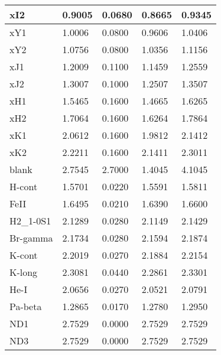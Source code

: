 \begin{longtable*}[c]{|p{0.110\DUtablewidth}|p{0.086\DUtablewidth}|p{0.086\DUtablewidth}|p{0.145\DUtablewidth}|p{0.133\DUtablewidth}|}
xI2
 & 
0.9005
 & 
0.0680
 & 
0.8665
 & 
0.9345
 \\
\hline

xY1
 & 
1.0006
 & 
0.0800
 & 
0.9606
 & 
1.0406
 \\
\hline

xY2
 & 
1.0756
 & 
0.0800
 & 
1.0356
 & 
1.1156
 \\
\hline

xJ1
 & 
1.2009
 & 
0.1100
 & 
1.1459
 & 
1.2559
 \\
\hline

xJ2
 & 
1.3007
 & 
0.1000
 & 
1.2507
 & 
1.3507
 \\
\hline

xH1
 & 
1.5465
 & 
0.1600
 & 
1.4665
 & 
1.6265
 \\
\hline

xH2
 & 
1.7064
 & 
0.1600
 & 
1.6264
 & 
1.7864
 \\
\hline

xK1
 & 
2.0612
 & 
0.1600
 & 
1.9812
 & 
2.1412
 \\
\hline

xK2
 & 
2.2211
 & 
0.1600
 & 
2.1411
 & 
2.3011
 \\
\hline

blank
 & 
2.7545
 & 
2.7000
 & 
1.4045
 & 
4.1045
 \\
\hline

H-cont
 & 
1.5701
 & 
0.0220
 & 
1.5591
 & 
1.5811
 \\
\hline

FeII
 & 
1.6495
 & 
0.0210
 & 
1.6390
 & 
1.6600
 \\
\hline

H2\_1-0S1
 & 
2.1289
 & 
0.0280
 & 
2.1149
 & 
2.1429
 \\
\hline

Br-gamma
 & 
2.1734
 & 
0.0280
 & 
2.1594
 & 
2.1874
 \\
\hline

K-cont
 & 
2.2019
 & 
0.0270
 & 
2.1884
 & 
2.2154
 \\
\hline

K-long
 & 
2.3081
 & 
0.0440
 & 
2.2861
 & 
2.3301
 \\
\hline

He-I
 & 
2.0656
 & 
0.0270
 & 
2.0521
 & 
2.0791
 \\
\hline

Pa-beta
 & 
1.2865
 & 
0.0170
 & 
1.2780
 & 
1.2950
 \\
\hline

ND1
 & 
2.7529
 & 
0.0000
 & 
2.7529
 & 
2.7529
 \\
\hline

ND3
 & 
2.7529
 & 
0.0000
 & 
2.7529
 & 
2.7529
 \\
\hline
\end{longtable*}
\label{tbl-filter-wheel}


